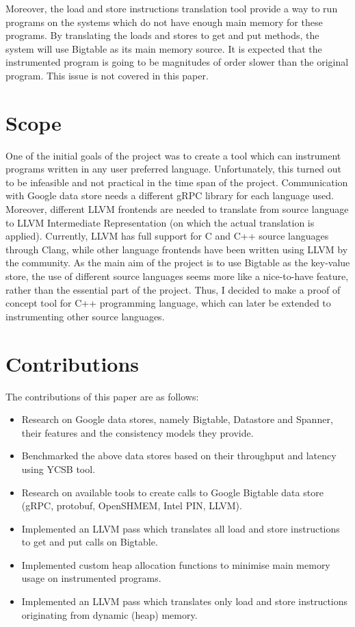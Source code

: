 \documentclass[bsc,frontabs,twoside,singlespacing,parskip,deptreport]{infthesis}     %
\begin{document}
Moreover, the load and store instructions translation tool provide a way to run programs on the systems which do not have enough main memory for these programs. By translating the loads and stores to get and put methods, the system will use Bigtable as its main memory source. It is expected that the instrumented program is going to be magnitudes of order slower than the original program. This issue is not covered in this paper.

\section{Scope}

One of the initial goals of the project was to create a tool which can instrument programs written in any user preferred language. Unfortunately, this turned out to be infeasible and not practical in the time span of the project. Communication with Google data store needs a different  gRPC library for each language used. Moreover, different LLVM frontends are needed to translate from source language to LLVM Intermediate Representation (on which the actual translation is applied). Currently, LLVM has full support for C and C++ source languages through Clang, while other language frontends have been written using LLVM by the community. As the main aim of the project is to use Bigtable as the key-value store, the use of different source languages seems more like a nice-to-have feature, rather than the essential part of the project. Thus, I decided to make a proof of concept tool for C++ programming language, which can later be extended to instrumenting other source languages. 

\section{Contributions}

The contributions of this paper are as follows:
\begin{itemize}
\item
Research on Google data stores, namely Bigtable, Datastore and Spanner, their features and the consistency models they provide.
\item
Benchmarked the above data stores based on their throughput and latency using YCSB tool.
\item
Research on available tools to create calls to Google Bigtable data store (gRPC, protobuf, OpenSHMEM, Intel PIN, LLVM).
\item
Implemented an LLVM pass which translates all load and store instructions to get and put calls on Bigtable.
\item
Implemented custom heap allocation functions to minimise main memory usage on instrumented programs.
\item
Implemented an LLVM pass which translates only load and store instructions originating from dynamic (heap) memory.
\end{itemize}
\end{document}
